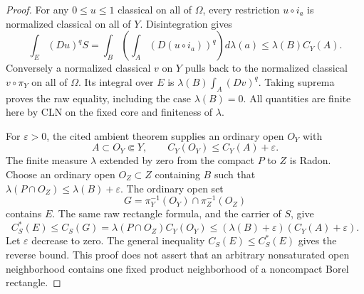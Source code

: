 \documentclass[11pt,a4paper]{article}
\numberwithin{equation}{section}
\theoremstyle{definition}
\theoremstyle{remark}
\begin{document}
\begin{proof}
For any $0\leq u\leq1$ classical on all of $\Omega$, every restriction
$u\circ i_a$ is normalized classical on all of $Y$. Disintegration gives
\[
          \int_E(Du)^qS
              =\int_B\left(\int_A(D(u\circ i_a))^q\right)d\lambda(a)
              \leq\lambda(B)C_Y(A).
\]
Conversely a normalized classical $v$ on $Y$ pulls back to the normalized
classical $v\circ\pi_Y$ on all of $\Omega$. Its integral over $E$ is
$\lambda(B)\int_A(Dv)^q$. Taking suprema proves the raw equality,
including the case $\lambda(B)=0$. All quantities are finite here by
CLN on the fixed core and finiteness of $\lambda$.

For $\varepsilon>0$, the cited ambient theorem supplies an ordinary
open $O_Y$ with
\[
        A\subset O_Y\Subset Y,\qquad C_Y(O_Y)\leq C_Y(A)+\varepsilon.
\]
The finite measure $\lambda$ extended by zero from the compact $P$ to
$Z$ is Radon. Choose an ordinary open $O_Z\subset Z$ containing $B$
such that $\lambda(P\cap O_Z)\leq\lambda(B)+\varepsilon$.
The ordinary open set
\[
            G=\pi_Y^{-1}(O_Y)\cap\pi_Z^{-1}(O_Z)
\]
contains $E$. The same raw rectangle formula, and the carrier of $S$,
give
\[
 C_S^*(E)\leq C_S(G)
     =\lambda(P\cap O_Z)C_Y(O_Y)
     \leq(\lambda(B)+\varepsilon)(C_Y(A)+\varepsilon).
\]
Let $\varepsilon$ decrease to zero. The general inequality
$C_S(E)\leq C_S^*(E)$ gives the reverse bound. This proof does not
assert that an arbitrary nonsaturated open neighborhood contains one
fixed product neighborhood of a noncompact Borel rectangle.
\end{proof}
\end{document}
